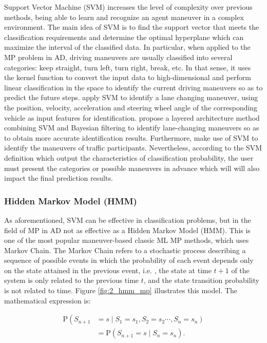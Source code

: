 Support Vector Machine (SVM) increases the level of complexity over previous methods, being able to learn and recognize an agent maneuver in a complex environment. The main idea of SVM is to find the support vector that meets the classification requirements and determine the optimal hyperplane which can maximize the interval of the classified data. In particular, when applied to the \ac{MP} problem in \ac{AD}, driving maneuvers are usually classified into several categories: keep straight, turn left, turn right, break, etc. In that sense, it uses the kernel function to convert the input data to high-dimensional and perform linear classification in the space to identify the current driving maneuvers so as to predict the future steps. \cite{mandalia2005using} apply SVM to identify a lane changing maneuver, using the position, velocity, acceleration and steering wheel angle of the corresponding vehicle as input features for identification. \cite{kumar2013learning} propose a layered architecture method combining SVM and Bayesian filtering to identify lane-changing maneuvers so as to obtain more accurate identification results. Furthermore, \cite{aoude2009using} make use of SVM to identify the maneuvers of traffic participants. Nevertheless, according to the SVM definition which output the characteristics of classification probability, the user must present the categories or possible maneuvers in advance which will will also impact the final prediction results.

\subsubsection{Hidden Markov Model (HMM)}
\label{subsubsec:2_hmm_mp}

As aforementioned, SVM can be effective in classification problems, but in the field of \ac{MP} in \ac{AD} not as effective as a Hidden Markov Model (HMM). This is one of the most popular maneuver-based classic ML \ac{MP} methods, which uses Markov Chain. The Markov Chain refers to a stochastic process describing a sequence of possible events in which the probability of each event depends only on the state attained in the previous event, i.e. , the state at time $t+1$ of the system is only related to the previous time $t$, and the state transition probability is not related to time. Figure \ref{fig:2_hmm_mp} illustrates this model. The mathematical expression is:

\begin{equation}
	\begin{aligned}
		\mathrm{P}\left(S_{n+1}\right. & \left.=s \mid S_1=s_1, S_2=s_2 \cdots, S_n=s_n\right) \\
		& =\mathrm{P}\left(S_{n+1}=s \mid S_n=s_n\right) .
	\end{aligned}
\end{equation}

